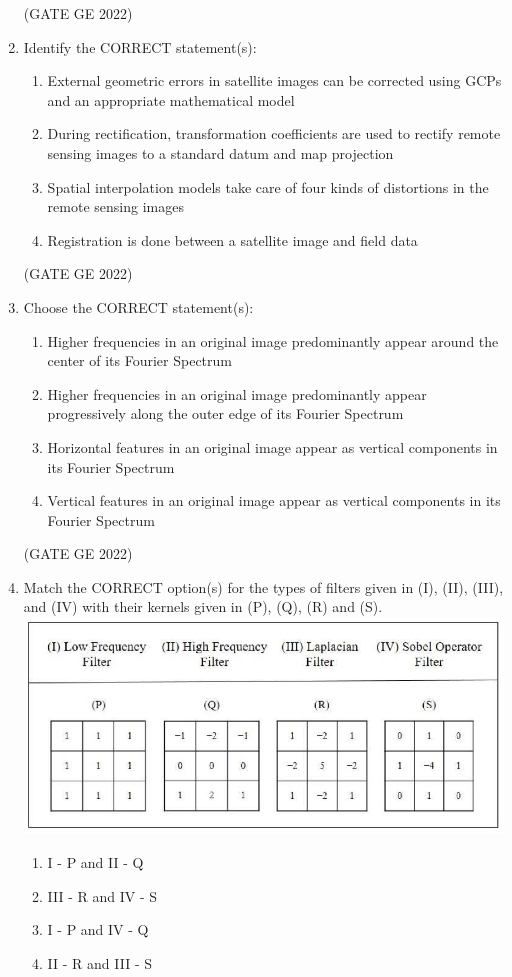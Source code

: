 \documentclass[a4paper, 11pt]{article}
\begin{document}
\begin{enumerate}
\hfill (GATE GE 2022)

\item Identify the CORRECT statement(s):
\begin{enumerate}
    \item External geometric errors in satellite images can be corrected using GCPs and an appropriate mathematical model
    \item During rectification, transformation coefficients are used to rectify remote sensing images to a standard datum and map projection
    \item Spatial interpolation models take care of four kinds of distortions in the remote sensing images
    \item Registration is done between a satellite image and field data
\end{enumerate}

\hfill (GATE GE 2022)

\item Choose the CORRECT statement(s):
\begin{enumerate}
    \item Higher frequencies in an original image predominantly appear around the center of its Fourier Spectrum
    \item Higher frequencies in an original image predominantly appear progressively along the outer edge of its Fourier Spectrum
    \item Horizontal features in an original image appear as vertical components in its Fourier Spectrum
    \item Vertical features in an original image appear as vertical components in its Fourier Spectrum
\end{enumerate}

\hfill (GATE GE 2022)

\item Match the CORRECT option(s) for the types of filters given in (I), (II), (III), and (IV) with their kernels given in (P), (Q), (R) and (S).
\centering \includegraphics[width=\columnwidth]{figs/fig_78.png}
\begin{enumerate}
    \item I - P and II - Q
    \item III - R and IV - S
    \item I - P and IV - Q
    \item II - R and III - S
\end{enumerate}


\end{enumerate}
\end{document}
